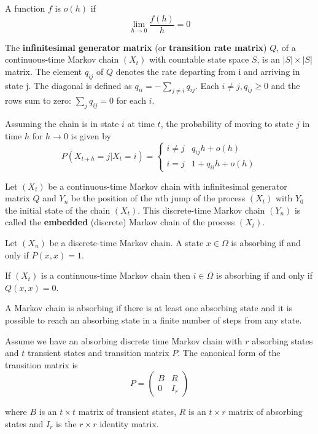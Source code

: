 \begin{defn}
A function $f$ is $o(h)$ if 
$$
\lim_{h \to 0} \frac{f(h)}{h} = 0
$$
\end{defn}

\begin{defn}
The \textbf{infinitesimal generator matrix} (or \textbf{transition rate matrix}) $Q$, of a continuous-time Markov chain $(X_t)$ with countable state space $S$, is an $|S| \times |S|$ matrix.
The element $q_{ij}$ of $Q$ denotes the rate departing from i and arriving in state j.
The diagonal is defined as $q_{ii} = - \sum_{j \not = i} q_{ij}$.
Each $i \not = j, q_{ij} \geq 0$ and the rows sum to zero: $\sum_{j} q_{ij} = 0$ for each $i$.

Assuming the chain is in state $i$ at time $t$, the probability of moving to state $j$ in time $h$ for $h \to 0$ is given by
$$
P(X_{t + h} = j | X_{t} = i) = \begin{cases}
    i \not = j & q_{ij} h + o(h)\\
    i = j & 1 + q_{ii} h + o(h)
\end{cases}
$$
\end{defn}

\begin{defn}
Let $(X_t)$ be a continuous-time Markov chain with infinitesimal generator matrix $Q$ and $Y_n$ be the position of the $n$th jump of the process $(X_t)$ with $Y_0$ the initial state of the chain $(X_t)$.
This discrete-time Markov chain $(Y_n)$ is called the \textbf{embedded} (discrete) Markov chain of the process $(X_t)$.
\end{defn}

\begin{defn} \cite{grinstead2003}
Let $(X_n)$ be a discrete-time Markov chain.
A state $x \in \Omega$ is absorbing if and only if $P(x,x) = 1$.

If $(X_t)$ is a continuous-time Markov chain then $i \in \Omega$ is absorbing if and only if $Q(x,x) = 0$.
\end{defn}

\begin{defn} \cite{grinstead2003}
A Markov chain is absorbing if there is at least one absorbing state and it is possible to reach an absorbing state in a finite number of steps from any state.
\end{defn}

\begin{defn} \cite{grinstead2003}
Assume we have an absorbing discrete time Markov chain with $r$ absorbing states and $t$ transient states and  transition matrix $P$.
The canonical form of the transition matrix is
\begin{equation}
    P = \begin{pmatrix}
        B & R\\
        0 & I_{r}
    \end{pmatrix}
\end{equation}

where $B$ is an $t \times t$ matrix of transient states, $R$ is an $t \times r$ matrix of absorbing states and $I_{r}$ is the $r \times r$ identity matrix.
\end{defn}

